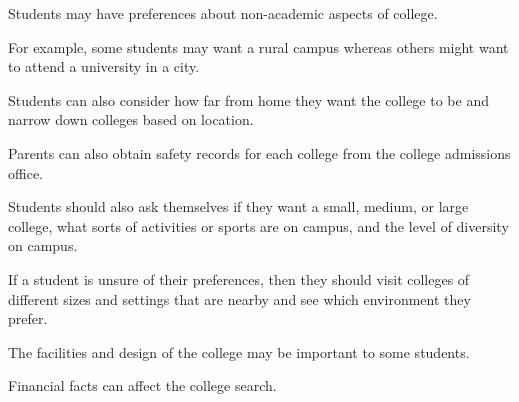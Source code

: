 \begin{inparaenum}[\bfseries 1]
\indent \item Students may have preferences about non-academic aspects of college. \item For example, some students may want a rural campus whereas others might want to attend a university in a city. \item Students can also consider how far from home they want the college to be and narrow down colleges based on location.  \item Parents can also obtain safety records for each college from the college admissions office. \item Students should also ask themselves if they want a small, medium, or large college, what sorts of activities or sports are on campus, and the level of diversity on campus. \item If a student is unsure of their preferences, then they should visit colleges of different sizes and settings that are nearby and see which environment they prefer. \item The facilities and design of the college may be important to some students. \item Financial facts can affect the college search.
\end{inparaenum}

